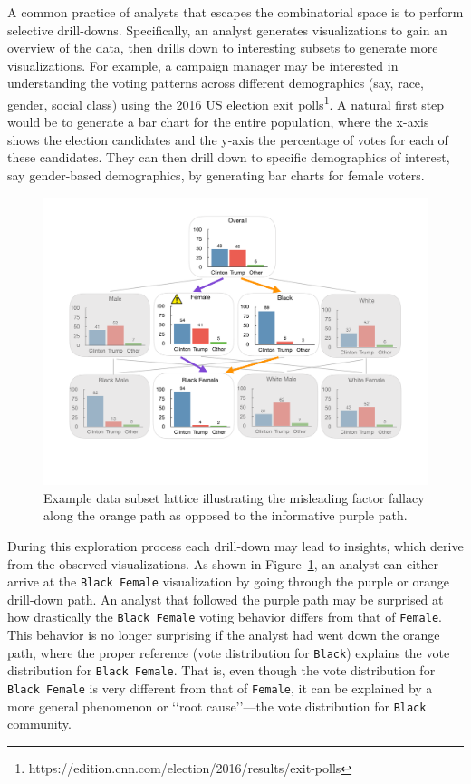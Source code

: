A common practice of analysts that escapes the combinatorial space is to perform selective drill-downs. Specifically, an analyst generates visualizations to gain an overview of the data, then drills down to interesting subsets to generate more visualizations. For example, a campaign manager may be interested in understanding the voting patterns across different demographics (say, race, gender, social class) using the 2016 US election exit polls\footnote{https://edition.cnn.com/election/2016/results/exit-polls}. A natural first step would be to generate a bar chart for the entire population, where the x-axis shows the election candidates and the y-axis the percentage of votes for each of these candidates. They can then drill down to specific demographics of interest, say gender-based demographics, by generating bar charts for female voters.

\begin{figure}[h!]
\includegraphics[width=\linewidth]{figures/elections_example_lattice_teaser.pdf}
\caption{Example data subset lattice illustrating the misleading factor fallacy along the orange path as opposed to the informative purple path.}
\label{fig:elections_example}
\end{figure}


During this exploration process each drill-down may lead to insights, which derive from the observed visualizations. As shown in Figure~\ref{fig:elections_example}, an analyst can either arrive at the \texttt{Black Female} visualization by going through the purple or orange drill-down path. An analyst that followed the purple path may be surprised at how drastically the \texttt{Black Female} voting behavior differs from that of \texttt{Female}. This behavior is no longer surprising if the analyst had went down the orange path, where the proper reference (vote distribution for \texttt{Black}) explains the vote distribution for \texttt{Black Female}. That is, even though the vote distribution for 
\texttt{Black Female} is very different from that of \texttt{Female}, it can be explained by a more general phenomenon or \lq\lq root cause\rq\rq ---the vote distribution for \texttt{Black} community.

